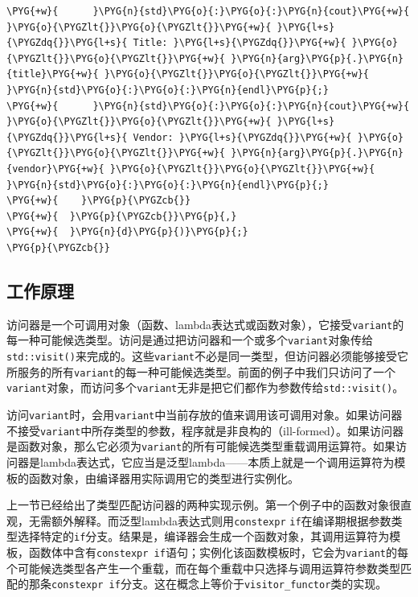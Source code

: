\begin{itemize}
\begin{codeblockbg}
\begin{Verbatim}[commandchars=\\\{\},breaklines=true,breakanywhere=true,fontsize=\codefont,xleftmargin=17bp]
\PYG{+w}{      }\PYG{n}{std}\PYG{o}{:}\PYG{o}{:}\PYG{n}{cout}\PYG{+w}{ }\PYG{o}{\PYGZlt{}}\PYG{o}{\PYGZlt{}}\PYG{+w}{ }\PYG{l+s}{\PYGZdq{}}\PYG{l+s}{ Title: }\PYG{l+s}{\PYGZdq{}}\PYG{+w}{ }\PYG{o}{\PYGZlt{}}\PYG{o}{\PYGZlt{}}\PYG{+w}{ }\PYG{n}{arg}\PYG{p}{.}\PYG{n}{title}\PYG{+w}{ }\PYG{o}{\PYGZlt{}}\PYG{o}{\PYGZlt{}}\PYG{+w}{ }\PYG{n}{std}\PYG{o}{:}\PYG{o}{:}\PYG{n}{endl}\PYG{p}{;}
\PYG{+w}{      }\PYG{n}{std}\PYG{o}{:}\PYG{o}{:}\PYG{n}{cout}\PYG{+w}{ }\PYG{o}{\PYGZlt{}}\PYG{o}{\PYGZlt{}}\PYG{+w}{ }\PYG{l+s}{\PYGZdq{}}\PYG{l+s}{ Vendor: }\PYG{l+s}{\PYGZdq{}}\PYG{+w}{ }\PYG{o}{\PYGZlt{}}\PYG{o}{\PYGZlt{}}\PYG{+w}{ }\PYG{n}{arg}\PYG{p}{.}\PYG{n}{vendor}\PYG{+w}{ }\PYG{o}{\PYGZlt{}}\PYG{o}{\PYGZlt{}}\PYG{+w}{ }\PYG{n}{std}\PYG{o}{:}\PYG{o}{:}\PYG{n}{endl}\PYG{p}{;}
\PYG{+w}{    }\PYG{p}{\PYGZcb{}}
\PYG{+w}{  }\PYG{p}{\PYGZcb{}}\PYG{p}{,}
\PYG{+w}{  }\PYG{n}{d}\PYG{p}{)}\PYG{p}{;}
\PYG{p}{\PYGZcb{}}
\end{Verbatim}
\end{codeblockbg}

\end{itemize}



\subsection{工作原理}



访问器是一个可调用对象（函数、lambda表达式或函数对象），它接受\texttt{variant}的每一种可能候选类型。访问是通过把访问器和一个或多个\texttt{variant}对象传给\texttt{std::\allowbreak{}visit()}来完成的。这些\texttt{variant}不必是同一类型，但访问器必须能够接受它所服务的所有\texttt{variant}的每一种可能候选类型。前面的例子中我们只访问了一个\texttt{variant}对象，而访问多个\texttt{variant}无非是把它们都作为参数传给\texttt{std::\allowbreak{}visit()}。



访问\texttt{variant}时，会用\texttt{variant}中当前存放的值来调用该可调用对象。如果访问器不接受\texttt{variant}中所存类型的参数，程序就是非良构的（ill-formed）。如果访问器是函数对象，那么它必须为\texttt{variant}的所有可能候选类型重载调用运算符。如果访问器是lambda表达式，它应当是泛型lambda——本质上就是一个调用运算符为模板的函数对象，由编译器用实际调用它的类型进行实例化。



上一节已经给出了类型匹配访问器的两种实现示例。第一个例子中的函数对象很直观，无需额外解释。而泛型lambda表达式则用\texttt{constexpr} \texttt{if}在编译期根据参数类型选择特定的\texttt{if}分支。结果是，编译器会生成一个函数对象，其调用运算符为模板，函数体中含有\texttt{constexpr if}语句；实例化该函数模板时，它会为\texttt{variant}的每个可能候选类型各产生一个重载，而在每个重载中只选择与调用运算符参数类型匹配的那条\texttt{constexpr if}分支。这在概念上等价于\texttt{visitor\_\allowbreak{}functor}类的实现。


